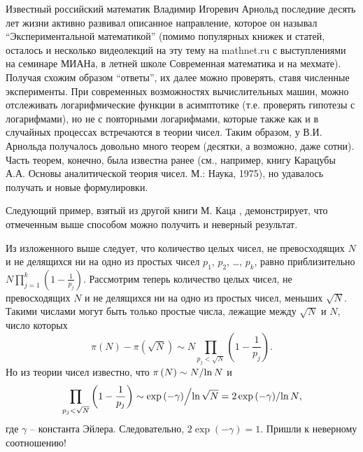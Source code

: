 \begin{remark} 
Известный российский математик Владимир Игоревич Арнольд 
последние десять лет жизни активно развивал описанное направление, которое 
он называл ``Экспериментальной математикой'' (помимо популярных книжек и 
статей, осталось и несколько видеолекций на эту тему на mathnet.ru
с выступлениями на семинаре МИАНа, в летней школе Современная математика и 
на мехмате). Получая схожим образом ``ответы'', их далее можно проверять, 
ставя численные эксперименты. При современных возможностях вычислительных 
машин, можно отслеживать логарифмические функции в асимптотике (т.е. 
проверять гипотезы с логарифмами), но не с повторными логарифмами, которые 
также как и в случайных процессах встречаются в теории чисел. Таким образом, 
у В.И. Арнольда получалось довольно много теорем (десятки, а возможно, даже сотни). 
Часть теорем, конечно, была известна ранее (см., например, книгу Карацубы 
А.А. Основы аналитической теория чисел. М.: Наука, 1975), но удавалось 
получать и новые формулировки.

Следующий пример, взятый из другой книги М. Каца \cite{20}, демонстрирует, что отмеченным выше 
способом можно получить и неверный результат.

\begin{example} Из изложенного выше следует, что количество целых чисел, не превосходящих $N$ и не делящихся ни на одно из простых 
чисел $p_1 $, $p_2 $, {\ldots}, $p_k $, равно приблизительно 
$N\prod\limits_{j=1}^k {\left( {1-\frac{1}{p_j }} \right)} $. Рассмотрим 
теперь количество целых чисел, не превосходящих $N$ и не делящихся ни на одно из 
простых чисел, меньших $\sqrt N $. Такими числами могут быть только простые 
числа, лежащие между $\sqrt N $ и $N$, число которых
\[
\pi \left( N \right)-\pi \left( {\sqrt N } \right)\sim N\prod\limits_{p_j 
<\sqrt N } {\left( {1-\frac{1}{p_j }} \right)} .
\]
Но из теории чисел известно, что $\pi \left( N \right)\sim N \mathord{\left/ 
{\vphantom {N {\ln N}}} \right. \kern-\nulldelimiterspace} {\ln N}$ и
\[
\prod\limits_{p_j <\sqrt N } {\left( {1-\frac{1}{p_j }} \right)} \sim {\exp 
\left( {-\gamma } \right)} \mathord{\left/ {\vphantom {{\exp \left( {-\gamma 
} \right)} {\ln \sqrt N }}} \right. \kern-\nulldelimiterspace} {\ln \sqrt N 
}={2\exp \left( {-\gamma } \right)} \mathord{\left/ {\vphantom {{2\exp 
\left( {-\gamma } \right)} {\ln N}}} \right. \kern-\nulldelimiterspace} {\ln 
N},
\]
где $\gamma $ -- константа Эйлера. Следовательно, $2\exp \left( {-\gamma } 
\right)=1$. Пришли к неверному соотношению!
\end{example}


\end{remark}
